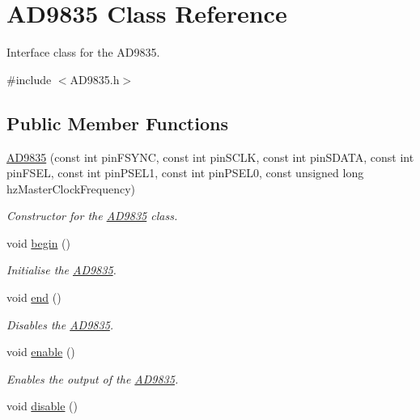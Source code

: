 \hypertarget{class_a_d9835}{
\section{AD9835 Class Reference}
\label{class_a_d9835}
}


Interface class for the AD9835.  




{\ttfamily \#include $<$AD9835.h$>$}

\subsection*{Public Member Functions}
\begin{DoxyCompactItemize}
\item 
\hyperlink{class_a_d9835_afe01ac229ed5836ba172cabeb40f4ca2}{AD9835} (const int pinFSYNC, const int pinSCLK, const int pinSDATA, const int pinFSEL, const int pinPSEL1, const int pinPSEL0, const unsigned long hzMasterClockFrequency)
\begin{DoxyCompactList}\small\item\em Constructor for the \hyperlink{class_a_d9835}{AD9835} class. \end{DoxyCompactList}\item 
void \hyperlink{class_a_d9835_abd6cd79aa94760c1bfbb86d77dc493d6}{begin} ()
\begin{DoxyCompactList}\small\item\em Initialise the \hyperlink{class_a_d9835}{AD9835}. \end{DoxyCompactList}\item 
\hypertarget{class_a_d9835_a8e6ec0591eac9218c379fadfacaf41af}{
void \hyperlink{class_a_d9835_a8e6ec0591eac9218c379fadfacaf41af}{end} ()}
\label{class_a_d9835_a8e6ec0591eac9218c379fadfacaf41af}

\begin{DoxyCompactList}\small\item\em Disables the \hyperlink{class_a_d9835}{AD9835}. \end{DoxyCompactList}\item 
\hypertarget{class_a_d9835_a6434f761a4353f0483c5d08191400f8c}{
void \hyperlink{class_a_d9835_a6434f761a4353f0483c5d08191400f8c}{enable} ()}
\label{class_a_d9835_a6434f761a4353f0483c5d08191400f8c}

\begin{DoxyCompactList}\small\item\em Enables the output of the \hyperlink{class_a_d9835}{AD9835}. \end{DoxyCompactList}\item 
\hypertarget{class_a_d9835_ac9f727d658e71b63fec2a81eb60fc82b}{
void \hyperlink{class_a_d9835_ac9f727d658e71b63fec2a81eb60fc82b}{disable} ()}
\label{class_a_d9835_ac9f727d658e71b63fec2a81eb60fc82b}


\end{DoxyCompactItemize}
